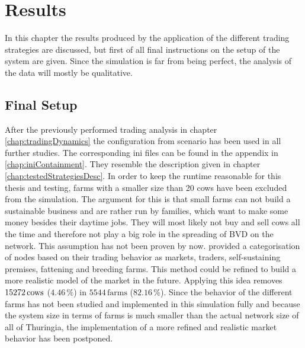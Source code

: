 \chapter{Results}
In this chapter the results produced by the application of the different trading strategies are discussed, but first of all final instructions on the setup of the system are given. Since the simulation is far from being perfect, the analysis of the data will mostly be qualitative.
\section{Final Setup}
After the previously performed trading analysis in chapter \ref{chap:tradingDynamics} the configuration from scenario has been used in all further studies. The corresponding ini files can be found in the appendix in \ref{chap:iniContainment}. They resemble the description given in chapter \ref{chap:testedStrategiesDesc}.  
In order to keep the runtime reasonable for this thesis and testing, farms with a smaller size than 20 cows have been excluded from the simulation. The argument for this is that small farms can not build a sustainable business and are rather run by families, which want to make some money besides their daytime jobs. They will most likely not buy and sell cows all the time and therefore not play a big role in the spreading of BVD on the network. This assumption has not been proven by now. \citep{steinbach16} provided a categorisation of nodes based on their trading behavior as markets, traders, self-sustaining premises, fattening and breeding farms. This method could be refined to build a more realistic model of the market in the future. 
Applying this idea removes $15272\,\text{cows}$ ($4.46\,\%$) in $5544\,\text{farms}$ ($82.16\,\%$).
Since the behavior of the different farms has not been studied and implemented in this simulation fully and because the system size in terms of farms is much smaller than the actual network size of all of Thuringia, the implementation of a more refined and realistic market behavior has been postponed. 
